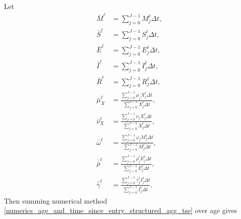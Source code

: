 \documentclass[USenglish]{article}
\begin{document}
Let
\begin{subequations}
  \begin{align}
    \bar{M}^{\ell} &= \sum_{j = 0}^{J - 1} M_j^{\ell} \Delta t,
    \\
    \bar{S}^{\ell} &= \sum_{j = 0}^{J - 1} S_j^{\ell} \Delta t,
    \\
    \bar{E}^{\ell} &= \sum_{j = 0}^{J - 1} E_j^{\ell} \Delta t,
    \\
    \bar{I}^{\ell} &= \sum_{j = 0}^{J - 1} I_j^{\ell} \Delta t,
    \\
    \bar{R}^{\ell} &= \sum_{j = 0}^{J - 1} R_j^{\ell} \Delta t,
    \\
    \bar{\mu}_X^{\ell}
    &= \frac{\sum_{j = 0}^{J - 1} \mu_j X_j^{\ell} \Delta t}
    {\sum_{j = 0}^{J - 1} X_j^{\ell} \Delta t},
    \\
    \bar{\nu}_X^{\ell}
    &= \frac{\sum_{j = 0}^{J - 1} \nu_j X_j^{\ell} \Delta t}
    {\sum_{j = 0}^{J - 1} X_j^{\ell} \Delta t},
    \\
    \bar{\omega}^{\ell}
    &= \frac{\sum_{j = 0}^{J - 1} \omega_j M_j^{\ell} \Delta t}
    {\sum_{j = 0}^{J - 1} M_j^{\ell} \Delta t},
    \\
    \bar{\bar{\rho}}^{\ell}
    &= \frac{\sum_{j = 0}^{J - 1} \bar{\rho}_j^{\ell} E_j^{\ell} \Delta t}
    {\sum_{j = 0}^{J - 1} E_j^{\ell} \Delta t},
    \\
    \bar{\bar{\gamma}}^{\ell}
    &= \frac{\sum_{j = 0}^{J - 1} \bar{\gamma}_j^{\ell} I_j^{\ell} \Delta t}
    {\sum_{j = 0}^{J - 1} I_j^{\ell} \Delta t}.
  \end{align}
\end{subequations}
Then summing numerical method
\eqref{numerics_age_and_time_since_entry_structured_agg_tse} over
age gives
\end{document}
